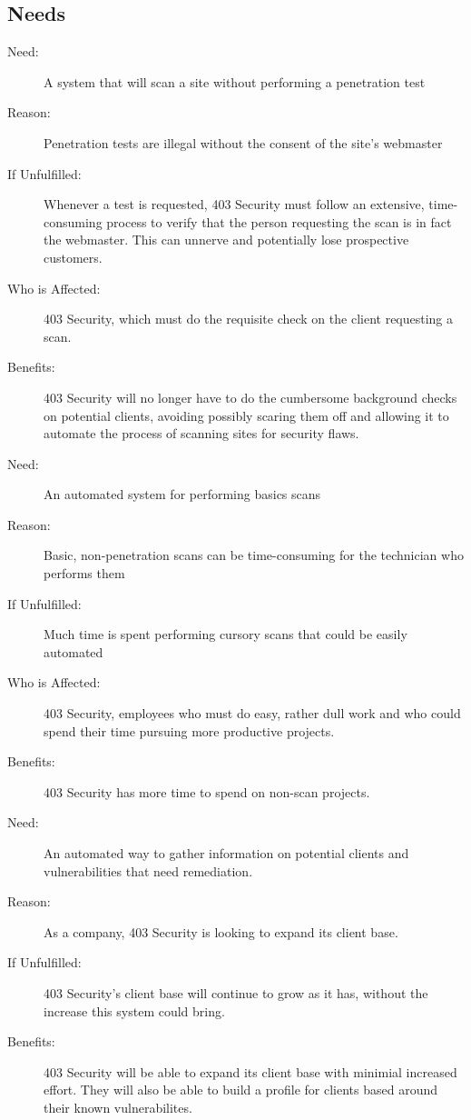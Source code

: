 \subsection{Needs}
\begin{description}
\item[Need: ]{A system that will scan a site without performing a penetration test}
\item[Reason: ]{Penetration tests are illegal without the consent of the site's webmaster}
\item[If Unfulfilled: ]{Whenever a test is requested, 403 Security must follow an extensive, time-consuming process to verify that the person requesting the scan is in fact the webmaster.  This can unnerve and potentially lose prospective customers.}
\item[Who is Affected:]{403 Security, which must do the requisite check on the client requesting a scan.}
\item[Benefits:]{403 Security will no longer have to do the cumbersome background checks on potential clients, avoiding possibly scaring them off and allowing it to automate the process of scanning sites for security flaws.}\\
\item[Need: ]{An automated system for performing basics scans}
\item[Reason: ]{Basic, non-penetration scans can be time-consuming for the technician who performs them}\item[If Unfulfilled:	]{Much time is spent performing cursory scans that could be easily automated}\item[Who is Affected:	]{403 Security, employees who must do easy, rather dull work and who could spend their time pursuing more productive projects.}
\item[Benefits:	]{403 Security has more time to spend on non-scan projects. }\\
\item[Need: ]{An automated way to gather information on potential clients and vulnerabilities that need remediation.}
\item[Reason:	]{As a company, 403 Security is looking to expand its client base.}
\item[If Unfulfilled:	]{403 Security's client base will continue to grow as it has, without the increase this system could bring.}
\item[Benefits: ]{403 Security will be able to expand its client base with minimial increased effort.  They will also be able to build a profile for clients based around their known vulnerabilites.}
\end{description}

